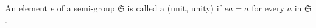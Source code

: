 An element $e$ of a semi-group $\mathfrak{S}$ is called a  (unit, unity) if $ea = a$ for every $a$ in $\mathfrak{S}$.
